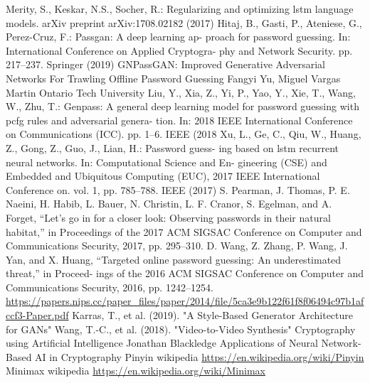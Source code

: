 \begin{thebibliography}
        Merity, S., Keskar, N.S., Socher, R.: Regularizing and optimizing lstm language
        models. arXiv preprint arXiv:1708.02182 (2017)
        \url{}
        Hitaj, B., Gasti, P., Ateniese, G., Perez-Cruz, F.: Passgan: A deep learning ap-
        proach for password guessing. In: International Conference on Applied Cryptogra-
        phy and Network Security. pp. 217–237. Springer (2019)
        \url{}
        GNPassGAN: Improved Generative Adversarial Networks For Trawling Offline Password Guessing
        Fangyi Yu, Miguel Vargas Martin
        Ontario Tech University
        \url{}
        Liu, Y., Xia, Z., Yi, P., Yao, Y., Xie, T., Wang, W., Zhu, T.: Genpass: A general
        deep learning model for password guessing with pcfg rules and adversarial genera-
        tion. In: 2018 IEEE International Conference on Communications (ICC). pp. 1–6.
        IEEE (2018
        \url{}
        Xu, L., Ge, C., Qiu, W., Huang, Z., Gong, Z., Guo, J., Lian, H.: Password guess-
        ing based on lstm recurrent neural networks. In: Computational Science and En-
        gineering (CSE) and Embedded and Ubiquitous Computing (EUC), 2017 IEEE
        International Conference on. vol. 1, pp. 785–788. IEEE (2017)
        \url{}
        S. Pearman, J. Thomas, P. E. Naeini, H. Habib, L. Bauer,
        N. Christin, L. F. Cranor, S. Egelman, and A. Forget, “Let’s go
        in for a closer look: Observing passwords in their natural habitat,”
        in Proceedings of the 2017 ACM SIGSAC Conference on Computer
        and Communications Security, 2017, pp. 295–310.
        \url{}
        D. Wang, Z. Zhang, P. Wang, J. Yan, and X. Huang, “Targeted
        online password guessing: An underestimated threat,” in Proceed-
        ings of the 2016 ACM SIGSAC Conference on Computer and
        Communications Security, 2016, pp. 1242–1254.
        \url{}
        \url{https://papers.nips.cc/paper_files/paper/2014/file/5ca3e9b122f61f8f06494c97b1afccf3-Paper.pdf}
        Karras, T., et al. (2019). "A Style-Based Generator Architecture for GANs"
        \url{}
        Wang, T.-C., et al. (2018). "Video-to-Video Synthesis" 
        Cryptography using Artificial Intelligence Jonathan Blackledge
        \url{}
        Applications of Neural Network-Based AI in Cryptography
        \url{}
    Pinyin wikipedia
    \url{https://en.wikipedia.org/wiki/Pinyin}
        Minimax wikipedia
        \url{https://en.wikipedia.org/wiki/Minimax}
\end{thebibliography}
